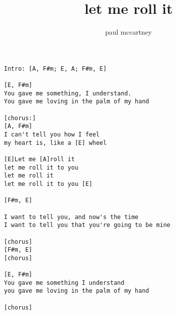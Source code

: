 \author{paul mccartney}
\title{let me roll it}
\maketitle
\begin{verbatim}
Intro: [A, F#m; E, A; F#m, E]

[E, F#m]
You gave me something, I understand.
You gave me loving in the palm of my hand

[chorus:]
[A, F#m]
I can't tell you how I feel
my heart is, like a [E] wheel

[E]Let me [A]roll it
let me roll it to you
let me roll it
let me roll it to you [E]

[F#m, E]

I want to tell you, and now's the time
I want to tell you that you're going to be mine

[chorus]
[F#m, E]
[chorus]

[E, F#m]
You gave me something I understand
you gave me loving in the palm of my hand

[chorus]
\end{verbatim}
